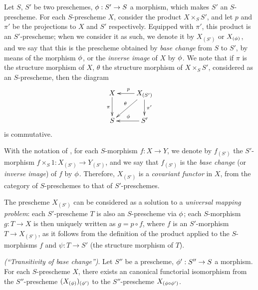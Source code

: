 \begin{env}[3.3.6]
\label{1.3.3.6}
Let $S$, $S'$ be two preschemes, $\vphi:S'\to S$ a morphism, which makes $S'$ an
$S$-prescheme. For each $S$-prescheme $X$, consider the product $X\times_S S'$,
and let $p$ and $\pi'$ be the projections to $X$ and $S'$ respectively. Equipped
with $\pi'$, this product is an $S'$-prescheme; when we consider it as such, we
denote it by $X_{(S')}$ or $X_{(\phi)}$, and we say that this is the prescheme
obtained by \emph{base change} from $S$ to $S'$, by means of the morphism
$\phi$, or the \emph{inverse image} of $X$ by $\phi$. We note that if $\pi$ is
the structure morphism of $X$, $\theta$ the structure morphism of
$X\times_S S'$, considered as an $S$-prescheme, then the diagram
\[
  \xymatrix{
    X\ar[d]_\pi &
    X_{(S')}\ar[l]_p\ar[ld]_\theta\ar[d]^{\pi'}\\
    S &
    S'\ar[l]_\vphi
  }
\]
is commutative.
\end{env}

\begin{env}[3.3.7]
\label{1.3.3.7}
With the notation of , for each $S$-morphism $f:X\to Y$, we
denote by $f_{(S')}$ the $S'$-morphism $f\times_S 1:X_{(S')}\to Y_{(S')}$, and
we say that $f_{(S')}$ is the \emph{base change} (or \emph{inverse image}) of
$f$ by $\phi$. Therefore, $X_{(S')}$ is a \emph{covariant functor} in $X$, from
the category of $S$-preschemes to that of $S'$-preschemes.
\end{env}

\begin{env}[3.3.8]
\label{1.3.3.8}
The prescheme $X_{(S')}$ can be considered as a solution to a \emph{universal
mapping problem}: each $S'$-prescheme $T$ is also an $S$-prescheme via $\phi$;
each $S$-morphism $g:T\to X$ is then uniquely written as $g=p\circ f$, where $f$
is an $S'$-morphism $T\to X_{(S')}$, as it follows from the definition of the
product applied to the $S$-morphisms $f$ and $\psi:T\to S'$ (the structure
morphism of $T$).
\end{env}

\begin{prop}[3.3.9]
\label{1.3.3.9}
\emph{(``Transitivity of base change'')}. Let $S''$ be a prescheme,
$\vphi':S''\to S$ a morphism. For each $S$-prescheme $X$, there exists an
canonical functorial isomorphism from the $S''$-prescheme
$(X_{(\phi)})_{(\phi')}$ to the $S''$-prescheme $X_{(\phi\circ\phi')}$.
\end{prop}

